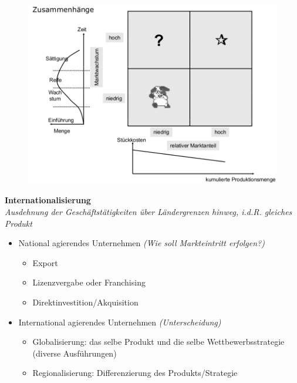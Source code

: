 \documentclass[a4paper,11pt, twoside]{article}
\newcommand\mpar[1]{\marginpar {\flushleft\small #1}}
\begin{document}
\begin{figure}[h]
 \begin{center}
   \includegraphics[scale=0.3]{bilder/portfolio_ext.png}
 \end{center}
\end{figure}
\newpage

\textbf{Internationalisierung}\\ 
\textit{Ausdehnung der Geschäftstätigkeiten über Ländergrenzen hinweg, i.d.R. gleiches Produkt}
\mpar{\textcolor{red}{Steuern/Gesetzte nehmen Einfluss}}
\begin{itemize}
	\item National agierendes Unternehmen \textit{(Wie soll Markteintritt erfolgen?)}\\
	\begin{itemize}
		\item Export
		\item Lizenzvergabe oder Franchising
		\item Direktinvestition/Akquisition
	\end{itemize}
	\item International agierendes Unternehmen \textit{(Unterscheidung)}\\
	\begin{itemize}
		\item Globalisierung: das selbe Produkt und die selbe Wettbewerbsstrategie (diverse Ausführungen)
		\item Regionalisierung: Differenzierung des Produkts/Strategie
	\end{itemize}
\end{itemize}
\end{document}
